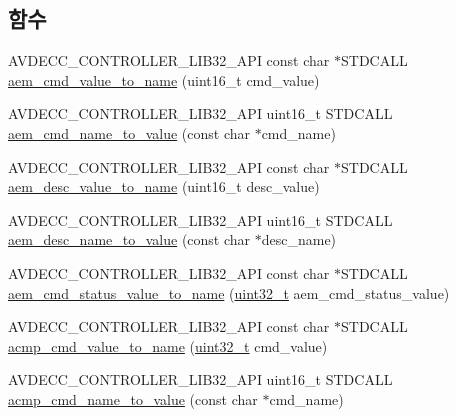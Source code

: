 \subsection*{함수}
\begin{DoxyCompactItemize}
\item 
A\+V\+D\+E\+C\+C\+\_\+\+C\+O\+N\+T\+R\+O\+L\+L\+E\+R\+\_\+\+L\+I\+B32\+\_\+\+A\+PI const char $\ast$S\+T\+D\+C\+A\+LL \hyperlink{namespaceavdecc__lib_1_1utility_a4c304db966bad783728a6a9e0aefed18}{aem\+\_\+cmd\+\_\+value\+\_\+to\+\_\+name} (uint16\+\_\+t cmd\+\_\+value)
\item 
A\+V\+D\+E\+C\+C\+\_\+\+C\+O\+N\+T\+R\+O\+L\+L\+E\+R\+\_\+\+L\+I\+B32\+\_\+\+A\+PI uint16\+\_\+t S\+T\+D\+C\+A\+LL \hyperlink{namespaceavdecc__lib_1_1utility_af5f5520a5b202802b381d0490389a5dd}{aem\+\_\+cmd\+\_\+name\+\_\+to\+\_\+value} (const char $\ast$cmd\+\_\+name)
\item 
A\+V\+D\+E\+C\+C\+\_\+\+C\+O\+N\+T\+R\+O\+L\+L\+E\+R\+\_\+\+L\+I\+B32\+\_\+\+A\+PI const char $\ast$S\+T\+D\+C\+A\+LL \hyperlink{namespaceavdecc__lib_1_1utility_a6bdd02679e5a911a071d4aa03be341f0}{aem\+\_\+desc\+\_\+value\+\_\+to\+\_\+name} (uint16\+\_\+t desc\+\_\+value)
\item 
A\+V\+D\+E\+C\+C\+\_\+\+C\+O\+N\+T\+R\+O\+L\+L\+E\+R\+\_\+\+L\+I\+B32\+\_\+\+A\+PI uint16\+\_\+t S\+T\+D\+C\+A\+LL \hyperlink{namespaceavdecc__lib_1_1utility_a9f6076e32fa227555a95b6e95ea1e29b}{aem\+\_\+desc\+\_\+name\+\_\+to\+\_\+value} (const char $\ast$desc\+\_\+name)
\item 
A\+V\+D\+E\+C\+C\+\_\+\+C\+O\+N\+T\+R\+O\+L\+L\+E\+R\+\_\+\+L\+I\+B32\+\_\+\+A\+PI const char $\ast$S\+T\+D\+C\+A\+LL \hyperlink{namespaceavdecc__lib_1_1utility_aca66a547b66fdb27f3221ad0844d60c6}{aem\+\_\+cmd\+\_\+status\+\_\+value\+\_\+to\+\_\+name} (\hyperlink{parse_8c_a6eb1e68cc391dd753bc8ce896dbb8315}{uint32\+\_\+t} aem\+\_\+cmd\+\_\+status\+\_\+value)
\item 
A\+V\+D\+E\+C\+C\+\_\+\+C\+O\+N\+T\+R\+O\+L\+L\+E\+R\+\_\+\+L\+I\+B32\+\_\+\+A\+PI const char $\ast$S\+T\+D\+C\+A\+LL \hyperlink{namespaceavdecc__lib_1_1utility_a89e861257b12dded819c0e1966cbb798}{acmp\+\_\+cmd\+\_\+value\+\_\+to\+\_\+name} (\hyperlink{parse_8c_a6eb1e68cc391dd753bc8ce896dbb8315}{uint32\+\_\+t} cmd\+\_\+value)
\item 
A\+V\+D\+E\+C\+C\+\_\+\+C\+O\+N\+T\+R\+O\+L\+L\+E\+R\+\_\+\+L\+I\+B32\+\_\+\+A\+PI uint16\+\_\+t S\+T\+D\+C\+A\+LL \hyperlink{namespaceavdecc__lib_1_1utility_ab3b547d5a65978dd9988b36992893cb5}{acmp\+\_\+cmd\+\_\+name\+\_\+to\+\_\+value} (const char $\ast$cmd\+\_\+name)

\end{DoxyCompactItemize}
